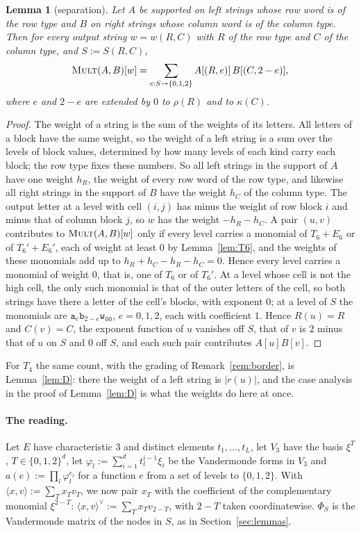 \documentclass[11pt]{article}
\newtheorem{lemma}[theorem]{Lemma}
\theoremstyle{definition}
\theoremstyle{remark}
\newcommand{\Mult}{\textnormal{\textsc{Mult}}}
\newcommand{\pairL}[2]{\langle #1,#2\rangle}
\newcommand{\pairR}[2]{\langle #1,#2\rangle^{\vee}}
\newcommand{\tl}[1]{\mathtt{#1}}
\begin{document}
\begin{lemma}[separation]\label{lem:sep}
Let $A$ be supported on left strings whose row word is of the row type and $B$ on right strings whose column word is of the column type. Then for every output string $w=w(R,C)$ with $R$ of the row type and $C$ of the column type, and $S:=S(R,C)$,
\[
\Mult(A,B)[w]=\sum_{e:S\to\{0,1,2\}}A[(R,e)]\,B[(C,2-e)],
\]
where $e$ and $2-e$ are extended by $0$ to $\rho(R)$ and to $\kappa(C)$.
\end{lemma}

\begin{proof}
The weight of a string is the sum of the weights of its letters. All letters of a block have the same weight, so the weight of a left string is a sum over the levels of block values, determined by how many levels of each kind carry each block; the row type fixes these numbers. So all left strings in the support of $A$ have one weight $h_R$, the weight of every row word of the row type, and likewise all right strings in the support of $B$ have the weight $h_C$ of the column type. The output letter at a level with cell $(i,j)$ has minus the weight of row block $i$ and minus that of column block $j$, so $w$ has the weight $-h_R-h_C$. A pair $(u,v)$ contributes to $\Mult(A,B)[w]$ only if every level carries a monomial of $T_6+E_6$ or of $T_6'+E_6'$, each of weight at least $0$ by Lemma~\ref{lem:T6}, and the weights of these monomials add up to $h_R+h_C-h_R-h_C=0$. Hence every level carries a monomial of weight $0$, that is, one of $T_6$ or of $T_6'$. At a level whose cell is not the high cell, the only such monomial is that of the outer letters of the cell, so both strings have there a letter of the cell's blocks, with exponent $0$; at a level of $S$ the monomials are $\mathtt a_e\mathtt b_{2-e}\tl{w_{00}}$, $e=0,1,2$, each with coefficient $1$. Hence $R(u)=R$ and $C(v)=C$, the exponent function of $u$ vanishes off $S$, that of $v$ is $2$ minus that of $u$ on $S$ and $0$ off $S$, and each such pair contributes $A[u]B[v]$.
\end{proof}

For $T_4$ the same count, with the grading of Remark~\ref{rem:border}, is Lemma~\ref{lem:D}: there the weight of a left string is $|r(u)|$, and the case analysis in the proof of Lemma~\ref{lem:D} is what the weights do here at once.

\paragraph{The reading.} Let $E$ have characteristic $3$ and distinct elements $t_1,\dots,t_L$, let $V_3$ have the basis $\xi^T$, $T\in\{0,1,2\}^d$, let $\varphi_l:=\sum_{i=1}^dt_l^{i-1}\xi_i$ be the Vandermonde forms in $V_3$ and $a(e):=\prod_l\varphi_l^{e_l}$ for a function $e$ from a set of levels to $\{0,1,2\}$. With $\pairL xv:=\sum_Tx_Tv_T$, we now pair $x_T$ with the coefficient of the complementary monomial $\xi^{2-T}$: $\pairR xv:=\sum_Tx_Tv_{2-T}$, with $2-T$ taken coordinatewise. $\Phi_S$ is the Vandermonde matrix of the nodes in $S$, as in Section~\ref{sec:lemmas}.
\end{document}
